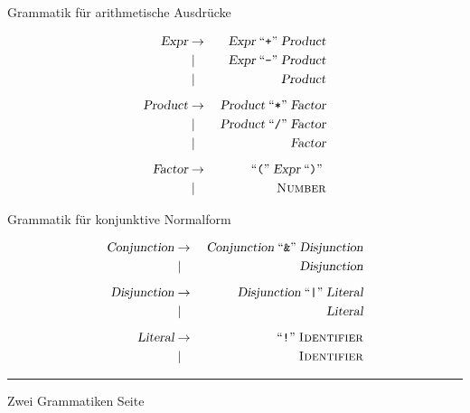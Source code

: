 \documentclass{slides}
\newcommand{\quoted}[1]{\;\mbox{``\texttt{#1}''}\;}
\newcounter{mypage}
\begin{document}
\begin{slide}{}
\normalsize
\begin{center}
Grammatik f\"ur arithmetische Ausdr\"ucke
\end{center}
\vspace{0.5cm}

\footnotesize

  \begin{eqnarray*}
  \textsl{Expr}    & \rightarrow & \;\textsl{Expr} \quoted{+} \textsl{Product}  \\
                   & \mid        & \;\textsl{Expr} \quoted{-} \textsl{Product}  \\
                   & \mid        & \;\textsl{Product}                           \\[0.2cm]
  \textsl{Product} & \rightarrow & \;\textsl{Product} \quoted{*} \textsl{Factor}\\
                   & \mid        & \;\textsl{Product} \quoted{/} \textsl{Factor}\\
                   & \mid        & \;\textsl{Factor}                            \\[0.2cm]
  \textsl{Factor}  & \rightarrow &   \quoted{(} \textsl{Expr} \quoted{)}        \\
                   & \mid        & \;\textsc{Number}                            \\
  \end{eqnarray*}

\normalsize
\begin{center}
Grammatik f\"ur konjunktive Normalform
\end{center}

\footnotesize
  \begin{eqnarray*}
  \textsl{Conjunction} & \rightarrow & \;\textsl{Conjunction} \quoted{\&} \textsl{Disjunction}  \\
                       & \mid        & \;\textsl{Disjunction}                                   \\[0.2cm]
  \textsl{Disjunction} & \rightarrow & \;\textsl{Disjunction} \quoted{|} \textsl{Literal}       \\
                       & \mid        & \;\textsl{Literal}                                       \\[0.2cm]
  \textsl{Literal}     & \rightarrow & \quoted{!} \textsc{Identifier}                           \\
                       & \mid        & \;\textsc{Identifier}  
  \end{eqnarray*}


\vspace*{\fill}
\tiny \addtocounter{mypage}{1}
\rule{17cm}{1mm}
Zwei Grammatiken  \hspace*{\fill} Seite 
\end{slide}
\end{document}
